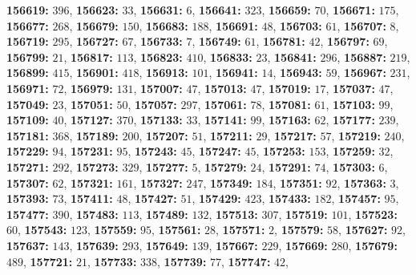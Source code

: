 \textsf{\bfseries 156619:} $396$, \textsf{\bfseries 156623:} $33$, \textsf{\bfseries 156631:} $6$, \textsf{\bfseries 156641:} $323$, \textsf{\bfseries 156659:} $70$, \textsf{\bfseries 156671:} $175$, \textsf{\bfseries 156677:} $268$, \textsf{\bfseries 156679:} $150$, \textsf{\bfseries 156683:} $188$, \textsf{\bfseries 156691:} $48$, \textsf{\bfseries 156703:} $61$, \textsf{\bfseries 156707:} $8$, \textsf{\bfseries 156719:} $295$, \textsf{\bfseries 156727:} $67$, \textsf{\bfseries 156733:} $7$, \textsf{\bfseries 156749:} $61$, \textsf{\bfseries 156781:} $42$, \textsf{\bfseries 156797:} $69$, \textsf{\bfseries 156799:} $21$, \textsf{\bfseries 156817:} $113$, \textsf{\bfseries 156823:} $410$, \textsf{\bfseries 156833:} $23$, \textsf{\bfseries 156841:} $296$, \textsf{\bfseries 156887:} $219$, \textsf{\bfseries 156899:} $415$, \textsf{\bfseries 156901:} $418$, \textsf{\bfseries 156913:} $101$, \textsf{\bfseries 156941:} $14$, \textsf{\bfseries 156943:} $59$, \textsf{\bfseries 156967:} $231$, \textsf{\bfseries 156971:} $72$, \textsf{\bfseries 156979:} $131$, \textsf{\bfseries 157007:} $47$, \textsf{\bfseries 157013:} $47$, \textsf{\bfseries 157019:} $17$, \textsf{\bfseries 157037:} $47$, \textsf{\bfseries 157049:} $23$, \textsf{\bfseries 157051:} $50$, \textsf{\bfseries 157057:} $297$, \textsf{\bfseries 157061:} $78$, \textsf{\bfseries 157081:} $61$, \textsf{\bfseries 157103:} $99$, \textsf{\bfseries 157109:} $40$, \textsf{\bfseries 157127:} $370$, \textsf{\bfseries 157133:} $33$, \textsf{\bfseries 157141:} $99$, \textsf{\bfseries 157163:} $62$, \textsf{\bfseries 157177:} $239$, \textsf{\bfseries 157181:} $368$, \textsf{\bfseries 157189:} $200$, \textsf{\bfseries 157207:} $51$, \textsf{\bfseries 157211:} $29$, \textsf{\bfseries 157217:} $57$, \textsf{\bfseries 157219:} $240$, \textsf{\bfseries 157229:} $94$, \textsf{\bfseries 157231:} $95$, \textsf{\bfseries 157243:} $45$, \textsf{\bfseries 157247:} $45$, \textsf{\bfseries 157253:} $153$, \textsf{\bfseries 157259:} $32$, \textsf{\bfseries 157271:} $292$, \textsf{\bfseries 157273:} $329$, \textsf{\bfseries 157277:} $5$, \textsf{\bfseries 157279:} $24$, \textsf{\bfseries 157291:} $74$, \textsf{\bfseries 157303:} $6$, \textsf{\bfseries 157307:} $62$, \textsf{\bfseries 157321:} $161$, \textsf{\bfseries 157327:} $247$, \textsf{\bfseries 157349:} $184$, \textsf{\bfseries 157351:} $92$, \textsf{\bfseries 157363:} $3$, \textsf{\bfseries 157393:} $73$, \textsf{\bfseries 157411:} $48$, \textsf{\bfseries 157427:} $51$, \textsf{\bfseries 157429:} $423$, \textsf{\bfseries 157433:} $182$, \textsf{\bfseries 157457:} $95$, \textsf{\bfseries 157477:} $390$, \textsf{\bfseries 157483:} $113$, \textsf{\bfseries 157489:} $132$, \textsf{\bfseries 157513:} $307$, \textsf{\bfseries 157519:} $101$, \textsf{\bfseries 157523:} $60$, \textsf{\bfseries 157543:} $123$, \textsf{\bfseries 157559:} $95$, \textsf{\bfseries 157561:} $28$, \textsf{\bfseries 157571:} $2$, \textsf{\bfseries 157579:} $58$, \textsf{\bfseries 157627:} $92$, \textsf{\bfseries 157637:} $143$, \textsf{\bfseries 157639:} $293$, \textsf{\bfseries 157649:} $139$, \textsf{\bfseries 157667:} $229$, \textsf{\bfseries 157669:} $280$, \textsf{\bfseries 157679:} $489$, \textsf{\bfseries 157721:} $21$, \textsf{\bfseries 157733:} $338$, \textsf{\bfseries 157739:} $77$, \textsf{\bfseries 157747:} $42$, 
